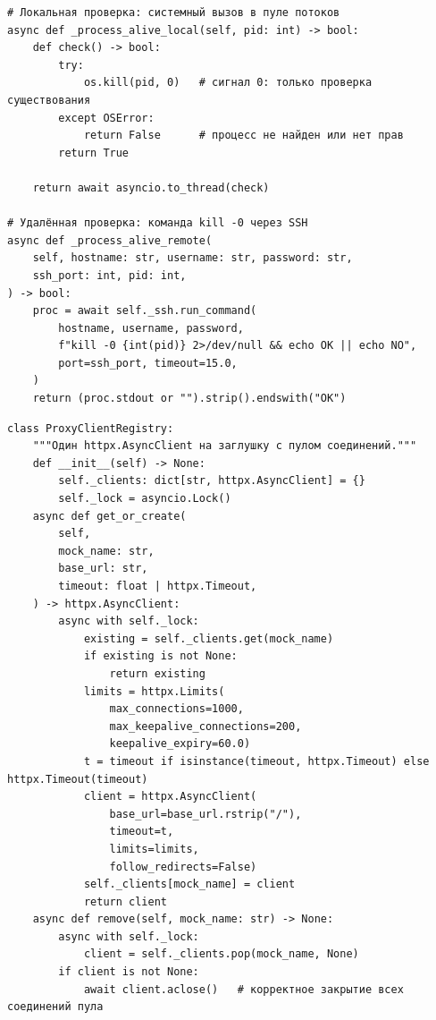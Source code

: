 \clearpage
\begin{listing}[H]
\caption{Методы проверки живости процесса}
\label{lst:process-alive}
\begin{mdframed}
\begin{verbatim}
# Локальная проверка: системный вызов в пуле потоков
async def _process_alive_local(self, pid: int) -> bool:
    def check() -> bool:
        try:
            os.kill(pid, 0)   # сигнал 0: только проверка существования
        except OSError:
            return False      # процесс не найден или нет прав
        return True

    return await asyncio.to_thread(check)

# Удалённая проверка: команда kill -0 через SSH
async def _process_alive_remote(
    self, hostname: str, username: str, password: str,
    ssh_port: int, pid: int,
) -> bool:
    proc = await self._ssh.run_command(
        hostname, username, password,
        f"kill -0 {int(pid)} 2>/dev/null && echo OK || echo NO",
        port=ssh_port, timeout=15.0,
    )
    return (proc.stdout or "").strip().endswith("OK")
\end{verbatim}
\end{mdframed}
\end{listing}

\clearpage
\begin{listing}[H]
\caption{Реестр HTTP-клиентов ProxyClientRegistry}
\label{lst:proxy-registry}
\begin{mdframed}
\begin{verbatim}
class ProxyClientRegistry:
    """Один httpx.AsyncClient на заглушку с пулом соединений."""
    def __init__(self) -> None:
        self._clients: dict[str, httpx.AsyncClient] = {}
        self._lock = asyncio.Lock()
    async def get_or_create(
        self,
        mock_name: str,
        base_url: str,
        timeout: float | httpx.Timeout,
    ) -> httpx.AsyncClient:
        async with self._lock:
            existing = self._clients.get(mock_name)
            if existing is not None:
                return existing
            limits = httpx.Limits(
                max_connections=1000,
                max_keepalive_connections=200,
                keepalive_expiry=60.0)
            t = timeout if isinstance(timeout, httpx.Timeout) else httpx.Timeout(timeout)
            client = httpx.AsyncClient(
                base_url=base_url.rstrip("/"),
                timeout=t,
                limits=limits,
                follow_redirects=False)
            self._clients[mock_name] = client
            return client
    async def remove(self, mock_name: str) -> None:
        async with self._lock:
            client = self._clients.pop(mock_name, None)
        if client is not None:
            await client.aclose()   # корректное закрытие всех соединений пула
\end{verbatim}
\end{mdframed}
\end{listing}

